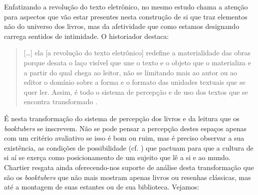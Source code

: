 Enfatizando a revolução do texto eletrônico, \citeauthor{chartier2019lersem} no mesmo estudo chama a atenção para aspectos que vão estar presentes nesta construção de si que traz elementos não do universo dos livros, mas da afetividade que como estamos designando carrega sentidos de intimidade. O
historiador destaca:

\begin{quote}
[\ldots] ela [a revolução do texto eletrônico] redefine a
materialidade das obras porque desata o laço visível que une o texto e o
objeto que o materializa e a partir do qual chega ao leitor, não se
limitando mais ao autor ou ao editor o domínio sobre a forma e o formato
das unidades textuais que se quer ler. Assim, é todo o sistema de
percepção e de uso dos textos que se encontra transformado \cite[p. 13–14]{chartier2019lersem}.
\end{quote}

É nesta transformação do sistema de percepção dos livros e da leitura
que os \textit{booktubers} se inscrevem. Não se pode pensar a percepção
destes espaços apenas com um critério avaliativo se isso é bom ou ruim,
mas é preciso observar a sua existência, as condições de possibilidade
(cf. \textcite{foucault2009arqueologia}) que pactuam para que a cultura de si aí se exerça como posicionamento de um sujeito que lê a si e ao mundo. Chartier
resgata ainda \textcite{lajolo_literatura_2017} oferecendo-nos suporte de
análise desta transformação que são os \textit{booktubers} que não mais
mostram apenas livros ou resenhas clássicas, mas até a montagem de suas
estantes ou de sua biblioteca. Vejamos:

